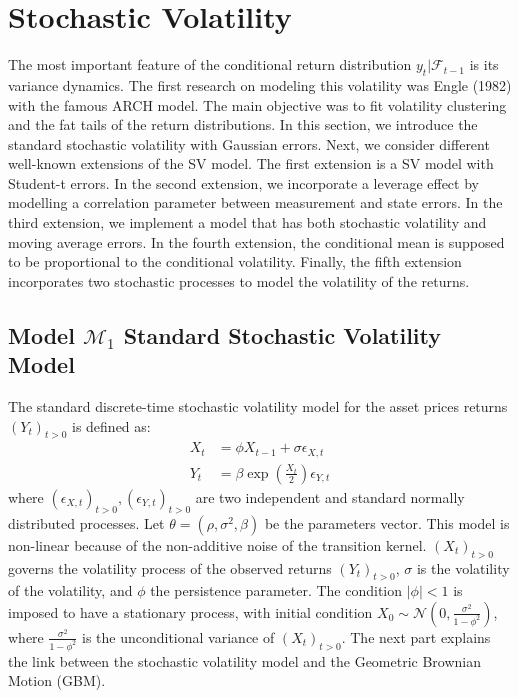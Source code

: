 \documentclass[11pt,a4,twosided,singlespacing,titlepagenumber=on]{scrreprt}
\numberwithin{equation}{chapter} %
\theoremstyle{remark}
\begin{document}
\chapter{Stochastic Volatility}
The most important feature of the conditional return distribution $y_t | \mathcal{F}_{t-1}$ is its variance dynamics. The first research on modeling this volatility was Engle (1982) with the famous ARCH model. The main objective was to fit volatility clustering and the fat tails of the return distributions.
In this section, we introduce the standard stochastic volatility with Gaussian errors. Next, we consider different well-known extensions of the SV model. The first extension is a SV model with Student-t errors. In the second extension, we incorporate a leverage effect by modelling a correlation parameter between measurement and state errors. In the third extension, we implement a model that has both stochastic volatility and moving average errors. In the fourth extension, the conditional mean is supposed to be proportional to the conditional volatility. Finally, the fifth extension incorporates two stochastic processes to model the volatility of the returns.

\section{Model $\mathcal{M}_1$ Standard Stochastic Volatility Model}
The standard discrete-time stochastic volatility model for the asset prices returns $(Y_t)_{t>0}$ is defined as:
\begin{align*}
  X_t &=  \phi X_{t-1} + \sigma \epsilon_{X,t} \\
  Y_t &=  \beta \exp \left( \frac{X_t}{2} \right) \epsilon_{Y,t}
\end{align*}
where $(\epsilon_{X,t})_{t>0},(\epsilon_{Y,t})_{t>0}$ are two independent and standard normally distributed processes. Let $\theta = (\rho, \sigma^2, \beta)$ be the parameters vector. This model is non-linear because of the non-additive noise of the transition kernel. $(X_t)_{t>0}$ governs the volatility process of the observed returns $(Y_t)_{t>0}$, $\sigma$ is the volatility of the volatility, and $\phi$ the persistence parameter. The condition $|\phi| < 1$  is imposed to have a stationary process, with initial condition $X_0 \sim \mathcal{N} \left(0, \frac{\sigma^2}{1-\phi^2} \right)$, where $\frac{\sigma^2}{1-\phi^2}$ is the unconditional variance of $(X_t)_{t>0}$. The next part explains the link between the stochastic volatility model and the Geometric Brownian Motion (GBM).
\end{document}
